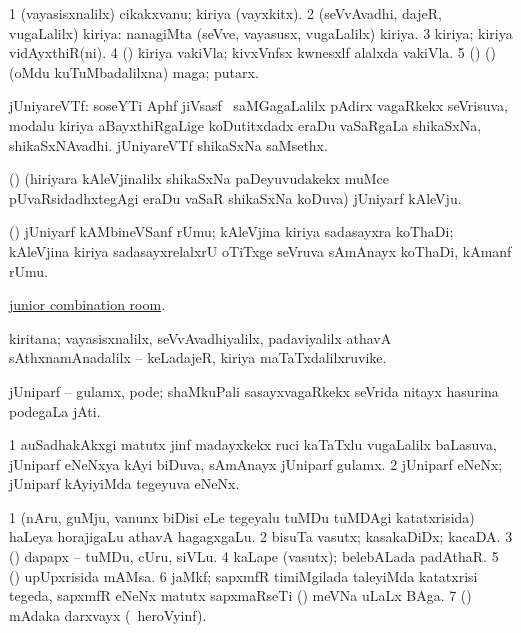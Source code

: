 \bentry
{}
\gl{\nA}
\bmng
\bnum
\num{1} (vayasisxnalilx) cikakxvanu; kiriya (vayxkitx). 
\num{2} (seVvAvadhi, dajeR, \mo vugaLalilx) kiriya:  nanagiMta (seVve, vayasusx, \mo vugaLalilx) kiriya. 
\num{3} kiriya; kiriya vidAyxthiR(ni). 
\num{4} (\birx) kiriya vakiVla; kivxVnfsx kwnesxlf alalxda vakiVla. 
\num{5} (\ame) (\AmA) (oMdu kuTuMbadalilxna) maga; putarx. 
\enum
\emng
\eentry

\bentry
{}
\gl{\nA}
\bmng
jUniyareVTf: 
\banum
{} soseYTi Aphf jiVsasf \mo\ saMGagaLalilx pAdirx vagaRkekx seVrisuva, modalu kiriya aBayxthiRgaLige koDutitxdadx eraDu vaSaRgaLa shikaSxNa, shikaSxNAvadhi. 
 jUniyareVTf shikaSxNa saMsethx. 
\eanum
\emng
\eentry

\bentry
{}
\gl{\nA}
\bmng
(\ame) (hiriyara kAleVjinalilx shikaSxNa paDeyuvudakekx muMce pUvaRsidadhxtegAgi eraDu vaSaR shikaSxNa koDuva) jUniyarf kAleVju. 
\emng
\eentry

\bentry
{}
\gl{\nA}
\bmng
(\birx) jUniyarf kAMbineVSanf rUmu; kAleVjina kiriya sadasayxra koThaDi; kAleVjina kiriya sadasayxrelalxrU oTiTxge seVruva sAmAnayx koThaDi, kAmanf rUmu. 
\emng
\eentry

\bentry
{}
\gl{\nA}
\bmng
 \hyperlink{junior combination room}{junior combination room}. 
\emng
\eentry

\bentry
{}
\gl{\nA}
\bmng
kiritana; vayasisxnalilx, seVvAvadhiyalilx, padaviyalilx athavA sAthxnamAnadalilx -- keLadajeR, kiriya maTaTxdalilxruvike. 
\emng
\eentry

\bentry
{}
\gl{\nA}
\bmng
jUniparf -- gulamx, pode; shaMkuPali sasayxvagaRkekx seVrida nitayx hasurina podegaLa jAti. 
\emng

\noindent
\gl{\pagu}
\bmng
\bnum
\num{1}  auSadhakAkxgi matutx jinf madayxkekx ruci kaTaTxlu \mo vugaLalilx baLasuva, jUniparf eNeNxya kAyi biDuva, sAmAnayx jUniparf gulamx. 
\num{2}  jUniparf eNeNx; jUniparf kAyiyiMda tegeyuva eNeNx. 
\enum
\emng
\eentry

\bentry
{}
\gl{\nA}
\bmng
\bnum
\num{1} (nAru, guMju, \mo vanunx biDisi eLe tegeyalu tuMDu tuMDAgi katatxrisida) haLeya horajigaLu athavA hagagxgaLu. 
\num{2} bisuTa vasutx; kasakaDiDx; kacaDA. 
\num{3} (\birx) dapapx -- tuMDu, cUru, siVLu. 
\num{4} kaLape (vasutx); belebALada padAthaR. 
\num{5} (\nw) upUpxrisida mAMsa. 
\num{6} jaMkf; sapxmfR timiMgilada taleyiMda katatxrisi tegeda, sapxmfR eNeNx matutx sapxmaRseTi () meVNa uLaLx BAga. 
\num{7} (\ashi) mAdaka darxvayx (\kanmu\ heroVyinf). 
\enum
\emng
\eentry

